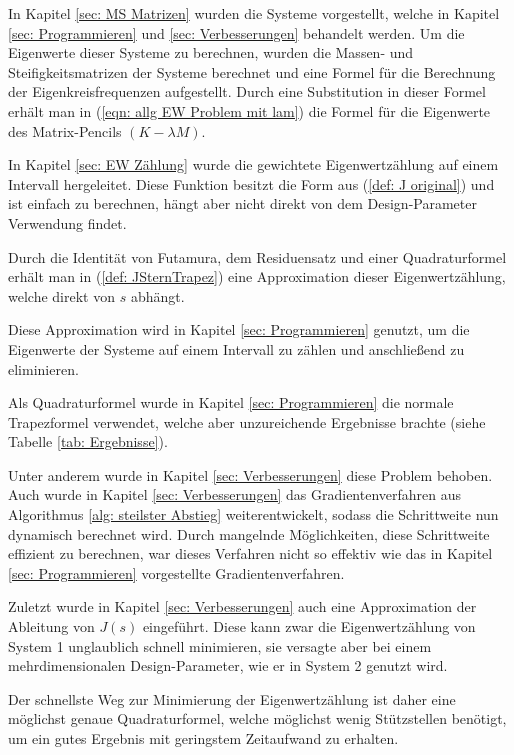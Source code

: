 \documentclass[a4paper,12pt]{report}
\newcommand{\1}{\mathds{1}}
\theoremstyle{plain} %
\theoremstyle{definition} %
\theoremstyle{remark}
\begin{document}
      In Kapitel \ref{sec: MS Matrizen} wurden die Systeme vorgestellt, welche in Kapitel \ref{sec: Programmieren} und \ref{sec: Verbesserungen} behandelt werden.
      Um die Eigenwerte dieser Systeme zu berechnen, wurden die Massen- und Steifigkeitsmatrizen der Systeme berechnet und eine Formel für die Berechnung der Eigenkreisfrequenzen aufgestellt.
      Durch eine Substitution in dieser Formel erhält man in (\ref{eqn: allg EW Problem mit lam}) die Formel für die Eigenwerte des Matrix-Pencils $(K-\lambda M)$.

      In Kapitel \ref{sec: EW Zählung} wurde die gewichtete Eigenwertzählung auf einem Intervall hergeleitet. Diese Funktion besitzt die Form aus (\ref{def: J original})
      und ist einfach zu berechnen, hängt aber nicht direkt von dem Design-Parameter Verwendung findet.

      Durch die Identität von Futamura, dem Residuensatz und einer Quadraturformel erhält man in (\ref{def: JSternTrapez}) eine Approximation dieser Eigenwertzählung,
      welche direkt von $s$ abhängt.

      Diese Approximation wird in Kapitel \ref{sec: Programmieren} genutzt, um die Eigenwerte der Systeme auf einem Intervall zu zählen und anschließend zu eliminieren.
      
      Als Quadraturformel wurde in Kapitel \ref{sec: Programmieren} die normale Trapezformel verwendet, welche aber unzureichende Ergebnisse brachte (siehe Tabelle \ref{tab: Ergebnisse}).

      Unter anderem wurde in Kapitel \ref{sec: Verbesserungen} diese Problem behoben.
      Auch wurde in Kapitel \ref{sec: Verbesserungen} das Gradientenverfahren aus Algorithmus \ref{alg: steilster Abstieg} weiterentwickelt, sodass die Schrittweite nun dynamisch berechnet wird.
      Durch mangelnde Möglichkeiten, diese Schrittweite effizient zu berechnen, war dieses Verfahren nicht so effektiv wie das in Kapitel \ref{sec: Programmieren} vorgestellte Gradientenverfahren.

      Zuletzt wurde in Kapitel \ref{sec: Verbesserungen} auch eine Approximation der Ableitung von $J(s)$ eingeführt.
      Diese kann zwar die Eigenwertzählung von System 1 unglaublich schnell minimieren, sie versagte aber bei einem mehrdimensionalen Design-Parameter, wie er in System 2 genutzt wird.

      Der schnellste Weg zur Minimierung der Eigenwertzählung ist daher eine möglichst genaue Quadraturformel,
      welche möglichst wenig Stützstellen benötigt, um ein gutes Ergebnis mit geringstem Zeitaufwand zu erhalten.
\end{document}
